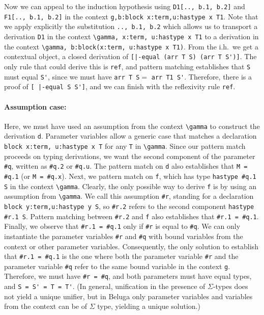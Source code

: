  Now we can appeal to the induction hypothesis using
 \lstinline!D1[.., b.1, b.2]! and \lstinline!F1[.., b.1, b.2]! in the context
 \lstinline!g,b:block x:term,u:hastype x T1!. Note that we apply explicitly the substitution \lstinline!.., b.1, b.2! which allows us to transport a derivation \lstinline!D1! in the context \lstinline!\gamma, x:term, u:hastype x T1! to a derivation in the context \lstinline!\gamma, b:block(x:term, u:hastype x T1)!.
  From the i.h.\ we get a
 contextual object, a closed derivation of
 \lstinline![|-equal (arr T S) (arr T S')]!. The only rule that could
 derive this is \lstinline{ref}, and pattern matching establishes that \lstinline{S}
 must equal \lstinline{S'}, since we must have \lstinline!arr T S!$ =$
\lstinline!arr T1 S'!.  Therefore, there is a proof of
\lstinline![ |-equal S S']!,
 and we can finish with the reflexivity rule \lstinline{ref}.

 \paragraph{Assumption case:} Here, we must have used an assumption from the
 context \lstinline!\gamma! to construct the derivation \lstinline{d}.  Parameter variables
  allow a generic case that matches a declaration
\lstinline!block x:term, u:hastype x T! for any \lstinline{T} in \lstinline!\gamma!. Since our pattern match
 proceeds on typing derivations, we want the second component of the
 parameter \lstinline{#q}, written as \lstinline{#q.2} or \lstinline!#q.u!.  The pattern match on \lstinline{d}
 also establishes that \lstinline{M = #q.1} (or \lstinline!M = #q.x!).
 Next, we pattern match on \lstinline{f}, which has type
\lstinline!hastype #q.1 S! in the context \lstinline!\gamma!.  Clearly, the only
 possible way to derive \lstinline{f} is by using an assumption from \lstinline!\gamma!. We call
 this assumption \lstinline{#r}, standing for a declaration
\lstinline!block y:term,u:hastype y S!, so \lstinline{#r.2} refers to the second component
\lstinline!hastype #r.1 S!. Pattern matching between \lstinline{#r.2} and \lstinline{f}
 also establishes that %
 \lstinline{#r.1 = #q.1}.  Finally, we observe that \lstinline{#r.1 = #q.1} only if
 \lstinline{#r} is equal to \lstinline{#q}. We can only instantiate the parameter
 variables \lstinline!#r! and \lstinline!#q! with bound variables from
 the context or other parameter variables. Consequently, the only
 solution to establish that \lstinline{#r.1 = #q.1} is the one where both the
 parameter variable \lstinline!#r! and the parameter variable
 \lstinline!#q! refer to the same bound variable in
 the context \lstinline!g!.  Therefore, we must have
 \lstinline!#r = #q!, and both
 parameters must have equal types, and \lstinline{S = S' = T = T'}.  (In general,
 unification in the presence
 of $\Sigma$-types does not yield a unique unifier, but in Beluga only
 parameter variables and variables from the context can be of $\Sigma$ type,
 yielding a unique solution.)




